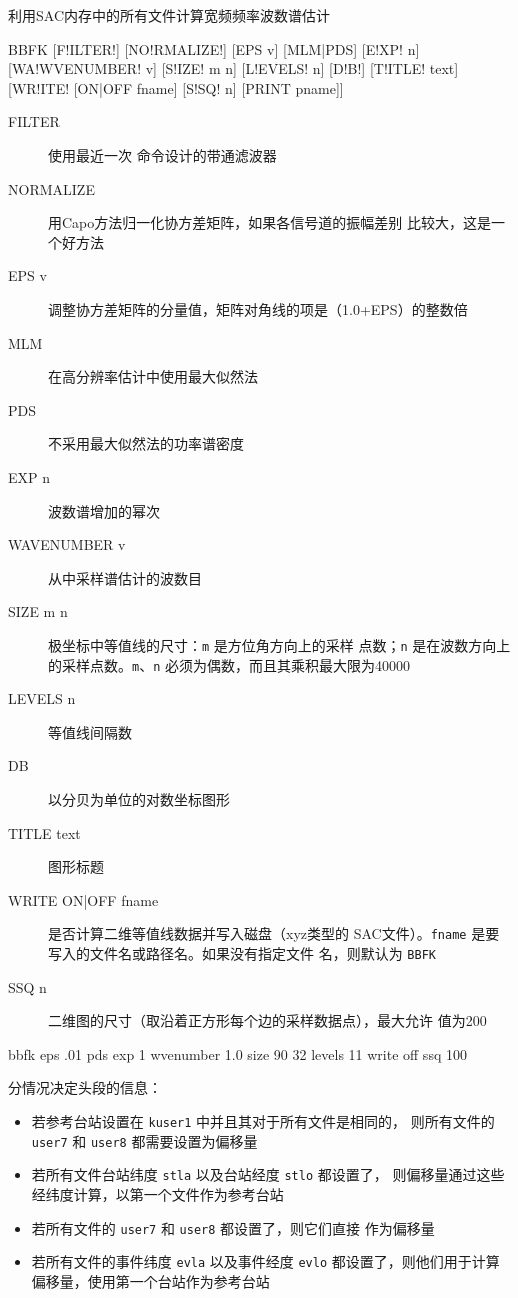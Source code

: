 \label{cmd:bbfk}

利用SAC内存中的所有文件计算宽频频率波数谱估计

\begin{SACSTX}
BBFK [F!ILTER!] [NO!RMALIZE!] [EPS v] [MLM|PDS] [E!XP! n] [WA!WVENUMBER! v]
    [S!IZE! m n] [L!EVELS! n] [D!B!] [T!ITLE! text] [WR!ITE! [ON|OFF fname]
    [S!SQ! n] [PRINT pname]]
\end{SACSTX}

\begin{description}
\item [FILTER] 使用最近一次 命令设计的带通滤波器
\item [NORMALIZE] 用Capo方法归一化协方差矩阵，如果各信号道的振幅差别
    比较大，这是一个好方法
\item [EPS v] 调整协方差矩阵的分量值，矩阵对角线的项是（1.0+EPS）的整数倍
\item [MLM] 在高分辨率估计中使用最大似然法
\item [PDS] 不采用最大似然法的功率谱密度
\item [EXP n] 波数谱增加的幂次
\item [WAVENUMBER v] 从中采样谱估计的波数目
\item [SIZE m n] 极坐标中等值线的尺寸：\texttt{m} 是方位角方向上的采样
    点数；\texttt{n} 是在波数方向上的采样点数。\texttt{m}、\texttt{n}
    必须为偶数，而且其乘积最大限为40000
\item [LEVELS n] 等值线间隔数
\item [DB] 以分贝为单位的对数坐标图形
\item [TITLE text] 图形标题
\item [WRITE ON|OFF fname] 是否计算二维等值线数据并写入磁盘（xyz类型的
    SAC文件）。\texttt{fname} 是要写入的文件名或路径名。如果没有指定文件
    名，则默认为 \texttt{BBFK}
\item [SSQ n] 二维图的尺寸（取沿着正方形每个边的采样数据点），最大允许
    值为200
\end{description}

\begin{SACDFT}
bbfk eps .01 pds exp 1 wvenumber 1.0 size 90 32 levels 11
    write off ssq 100
\end{SACDFT}

分情况决定头段的信息：
\begin{itemize}
\item 若参考台站设置在 \texttt{kuser1} 中并且其对于所有文件是相同的，
    则所有文件的 \texttt{user7} 和 \texttt{user8} 都需要设置为偏移量
\item 若所有文件台站纬度 \texttt{stla} 以及台站经度 \texttt{stlo} 都设置了，
    则偏移量通过这些经纬度计算，以第一个文件作为参考台站
\item 若所有文件的 \texttt{user7} 和 \texttt{user8} 都设置了，则它们直接
    作为偏移量
\item 若所有文件的事件纬度 \texttt{evla} 以及事件经度 \texttt{evlo}
    都设置了，则他们用于计算偏移量，使用第一个台站作为参考台站
\end{itemize}

